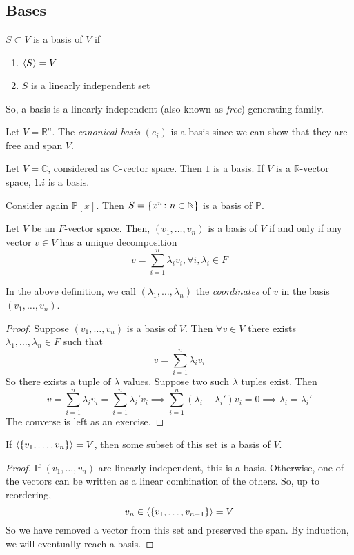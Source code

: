 \subsection{Bases}
\begin{definition}
	\( S \subset V \) is a basis of \( V \) if
	\begin{enumerate}
		\item \( \langle{} S \rangle = V \)
		\item \( S \) is a linearly independent set
	\end{enumerate}
	So, a basis is a linearly independent (also known as \textit{free}) generating family.
\end{definition}
\begin{example}
	Let \( V = \mathbb R^n \).
	The \textit{canonical basis} \( (e_i) \) is a basis since we can show that they are free and span \( V \).
\end{example}
\begin{example}
	Let \( V = \mathbb C \), considered as \( \mathbb C \)-vector space.
	Then \( \qty{1} \) is a basis.
	If \( V \) is a \( \mathbb R \)-vector space, \( \qty{1,i} \) is a basis.
\end{example}
\begin{example}
	Consider again \( \mathbb P[x] \).
	Then \( S = \qty{x^n \colon n \in \mathbb N} \) is a basis of \( \mathbb P \).
\end{example}
\begin{lemma}
	Let \( V \) be an \( F \)-vector space.
	Then, \( (v_1, \dots, v_n) \) is a basis of \( V \) if and only if any vector \( v \in V \) has a unique decomposition
	\[
		v = \sum_{i=1}^n \lambda_i v_i, \forall i, \lambda_i \in F
	\]
\end{lemma}
\begin{remark}
	In the above definition, we call \( (\lambda_1, \dots, \lambda_n) \) the \textit{coordinates} of \( v \) in the basis \( (v_1, \dots, v_n) \).
\end{remark}
\begin{proof}
	Suppose \( (v_1, \dots, v_n) \) is a basis of \( V \).
	Then \( \forall v \in V \) there exists \( \lambda_1, \dots, \lambda_n \in F \) such that
	\[
		v = \sum_{i=1}^n \lambda_i v_i
	\]
	So there exists a tuple of \( \lambda \) values.
	Suppose two such \( \lambda \) tuples exist.
	Then
	\[
		v = \sum_{i=1}^n \lambda_i v_i = \sum_{i=1}^n \lambda_i' v_i \implies \sum_{i=1}^n (\lambda_i - \lambda_i') v_i = 0 \implies \lambda_i = \lambda_i'
	\]
	The converse is left as an exercise.
\end{proof}
\begin{lemma}
	If \( \langle{} \qty{v_1, \dots, v_n} \rangle = V \), then some subset of this set is a basis of \( V \).
\end{lemma}
\begin{proof}
	If \( (v_1, \dots, v_n) \) are linearly independent, this is a basis.
	Otherwise, one of the vectors can be written as a linear combination of the others.
	So, up to reordering,
	\[
		v_n \in \langle{} \qty{v_1, \dots, v_{n-1}} \rangle = V
	\]
	So we have removed a vector from this set and preserved the span.
	By induction, we will eventually reach a basis.
\end{proof}

